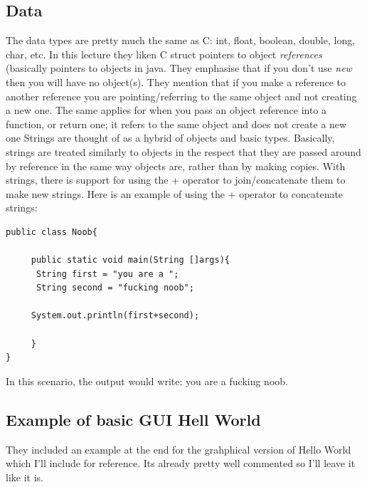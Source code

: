 \documentclass{article}
\begin{document}
\subsection{Data}
The data types are pretty much the same as C: int, float, boolean, double, long, char, etc. In this
lecture they liken C struct pointers to object \emph{references} (basically pointers to objects in java. 
They emphasise that if you don't use \emph{new} then you will have no object(s). They mention that if
you make a reference to another reference you are pointing/referring to the same object and not 
creating a new one. The same applies for when you pass an object reference into a function, or return 
one; it refers to the same object and does not create a new one
\newline
\newline
Strings are thought of as a hybrid of objects and basic types. Basically, strings are treated similarly
to objects in the respect that they are passed around by reference in the same way objects are, rather 
than by making copies. With strings, there is support for using the + operator to join/concatenate
them to make new strings. Here is an example of using the + operator to concatenate strings:
\newpage
  \begin{lstlisting}
public class Noob{

     public static void main(String []args){
      String first = "you are a ";
      String second = "fucking noob";
     
     System.out.println(first+second);
      
     }
}
  \end{lstlisting}
In this scenario, the output would write: you are a fucking noob.

\subsection{Example of basic GUI Hell World}

They included an example at the end for the grahphical version of Hello World which I'll include
for reference. Its already pretty well commented so I'll leave it like it is.
\end{document}
